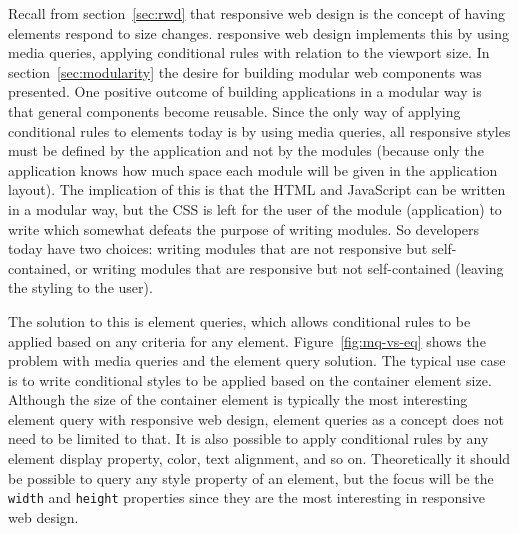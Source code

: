 \documentclass[a4paper,11pt]{kth-mag}
\newcommand{\code}[1]{\texttt{#1}}
\begin{document}
      Recall from section~\ref{sec:rwd} that \gls{responsive} \gls{web} design is the concept of having \glspl{element} respond to size changes.
      \Gls{responsive} \gls{web} design implements this by using \gls{media queries}, applying conditional rules with relation to the \gls{viewport} size.
      In section~\ref{sec:modularity} the desire for building modular \gls{web} components was presented.
      One positive outcome of building applications in a modular way is that general components become reusable.
      Since the only way of applying conditional rules to \glspl{element} today is by using \gls{media queries}, all \gls{responsive} styles must be defined by the application and not by the modules (because only the application knows how much space each module will be given in the application layout).
      The implication of this is that the \gls{HTML} and \gls{JavaScript} can be written in a modular way, but the \gls{CSS} is left for the user of the module (application) to write which somewhat defeats the purpose of writing modules.
      So developers today have two choices: writing modules that are not \gls{responsive} but \gls{self-contained}, or writing modules that are \gls{responsive} but not \gls{self-contained} (leaving the styling to the user).

      The solution to this is element queries, which allows conditional rules to be applied based on any criteria for any \gls{element}.
      Figure~\ref{fig:mq-vs-eq} shows the problem with \gls{media queries} and the element query solution.
      The typical use case is to write conditional styles to be applied based on the container \gls{element} size.
      Although the size of the container \gls{element} is typically the most interesting element query with \gls{responsive} \gls{web} design, element queries as a concept does not need to be limited to that.
      It is also possible to apply conditional rules by any \gls{element} display property, color, text alignment, and so on.
      Theoretically it should be possible to query any style property of an \gls{element}, but the focus will be the \code{width} and \code{height} properties since they are the most interesting in \gls{responsive} \gls{web} design.
\end{document}
